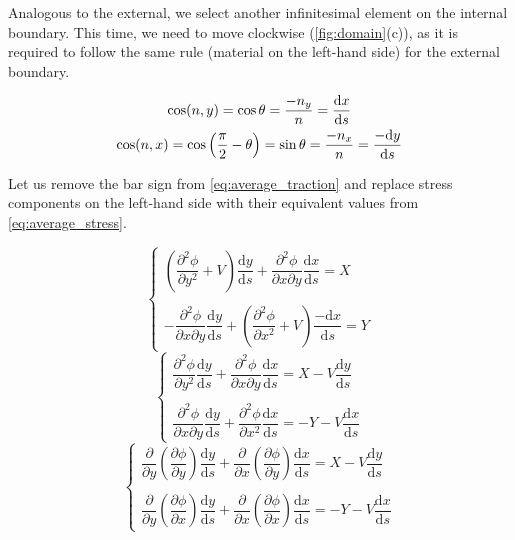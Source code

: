 \documentclass{article}
\begin{document}
Analogous to the external, we select another infinitesimal element on the internal boundary. This time, we need to move clockwise (\cref{fig:domain}(c)), as it is required to follow the same rule (material on the left-hand side) for the external boundary.

\begin{gather}
    \cos(n, y) = \cos \theta = \dfrac{-n_y}{n} = \dfrac{\mathrm{d}x}{\mathrm{d}s}  \notag \\
    \cos(n, x) = \cos \left(\dfrac{\pi}{2} - \theta\right) = \sin \theta = \dfrac{-n_x}{n} = \dfrac{-\mathrm{d}y}{\mathrm{d}s}
    \label{eq:internal_boundary}
\end{gather}

Let us remove the bar sign from \cref{eq:average_traction} and replace stress components on the left-hand side with their equivalent values from \cref{eq:average_stress}.

\begin{equation*}
\left\{\begin{matrix}
    \left(\dfrac{\partial^2 \phi}{\partial y^2} + V \right) \dfrac{\mathrm{d}y}{\mathrm{d}s} + \dfrac{\partial^2 \phi}{\partial x \partial y}  \dfrac{\mathrm{d}x}{\mathrm{d}s} = X   \\
    \\
    -\dfrac{\partial^2 \phi}{\partial x \partial y}  \dfrac{\mathrm{d}y}{\mathrm{d}s} + \left( \dfrac{\partial^2 \phi}{\partial x^2} + V \right) \dfrac{-\mathrm{d}x}{\mathrm{d}s} = Y  
\end{matrix}\right.
\end{equation*}
\begin{equation*}
\left\{\begin{matrix}
    \dfrac{\partial^2 \phi}{\partial y^2} \dfrac{\mathrm{d}y}{\mathrm{d}s} + \dfrac{\partial^2 \phi}{\partial x \partial y}  \dfrac{\mathrm{d}x}{\mathrm{d}s} = X - V \dfrac{\mathrm{d}y}{\mathrm{d}s} \\
    \\
    \dfrac{\partial^2 \phi}{\partial x \partial y}  \dfrac{\mathrm{d}y}{\mathrm{d}s} + \dfrac{\partial^2 \phi}{\partial x^2} \dfrac{\mathrm{d}x}{\mathrm{d}s} = -Y - V \dfrac{\mathrm{d}x}{\mathrm{d}s}  
\end{matrix}\right.
\end{equation*}
\begin{equation*}
\left\{\begin{matrix}
    \dfrac{\partial}{\partial y}\left( \dfrac{\partial \phi}{\partial y} \right) \dfrac{\mathrm{d}y}{\mathrm{d}s} + \dfrac{\partial}{\partial x}\left( \dfrac{\partial \phi}{\partial y} \right) \dfrac{\mathrm{d}x}{\mathrm{d}s} = X - V \dfrac{\mathrm{d}y}{\mathrm{d}s}\\
    \\
    \dfrac{\partial}{\partial y}\left( \dfrac{\partial \phi}{\partial x} \right) \dfrac{\mathrm{d}y}{\mathrm{d}s} + \dfrac{\partial}{\partial x}\left( \dfrac{\partial \phi}{\partial x} \right) \dfrac{\mathrm{d}x}{\mathrm{d}s} = -Y - V \dfrac{\mathrm{d}x}{\mathrm{d}s}  
\end{matrix}\right.
\end{equation*}
\end{document}
